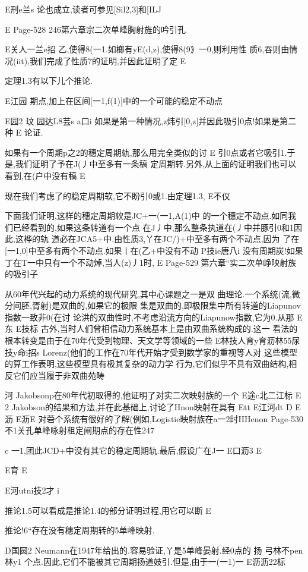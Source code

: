 {{E刑e兰s
论也成立,读者可参见[Sil2,3]和[ILJ

E
Page-528
246第六章宗二次单峰胸射旌的吟引孔

E关人一兰e招
乙,使得8(一1.如榔有yE(d,z),使得8(9》一0,则利用性
质6,吞则由情况(iit),我们完成了性质7的证明,并因此证明了定
E

定理1.3有以下儿个推论.

E江园
期点,加上在区间[一1,f(1)]中的一个可能的稳定不动点

E园2
玟
园达L8芸s
a口i
如果是第一种情况,z炜引[0,z]并因此吸引0点!如果是第二种
E
论证.

如果有一个周期p之2的穗定周期轨,那么用完全类似的讨
E
引0点或者它吸引1.于是,我们证明了予在J(丿中至多有一条稿
定周期转.另外,从上面的证明我们也可以看到,在(户中没有稿
E

现在我们考虑了的稳定周期软,它不盼引0或1.由定理1.3,
E不仪

下面我们证明,这样的穗定周期软是JC+一(一1,A(1)中
的一个穗定不动点.如同我们已经看到的,如果这条转道有一个点
在J丿中,那么整条执道在(丿中并豚引0和1因此,这桦的轨
道必在JCA5+中.由性质3,丫在JC/)+中至多有两个不动点,因为
了在[一1,0]中至多有两个不动点.如果丨在(乙+中没有不动
P技ie唐八i
没有周期炭!如果丁在T一中只有一个不动焯,当人(z)丿1时,
E
Page-529
第六章“实二次单峥映射族的吸引子

从60年代兴起的动力系统的现代研究,其中心课题之一是双
曲理论.一个系统(流,微分间胚,胥射)是双曲的,如果它的极限
集是双曲的,即极限集中所有转道的Liapunov指数一致非0(在讨
论洪的双曲性时,不考虑沿流方向的Liapunow指数,它为0.从那
E东
E技标
古外,当时人们曾相信动力系统基本上是由双曲系统构成的.这一
看法的根本转变是由于在70年代受到物理、天文学等领域的一些
E林技人育y育沥林55尿技y命i招s
Lorenz(他们的工作在70年代开始才受到数学家的重视等人对
这些模型的算工作表明,这些模型具有极其复杂的动力学
行为,它们似乎不具有双曲结构,相反它们应当履于非双曲苑畴

河
Jakobsonp在80年代初取得的,他证明了对实二次映射族的一个
E途c北二江标
E
2
Jakobson的结果和方法,并在此基础上,讨论了Hnon映射在具有
Ett
E江河dt
D
E沥
E沥E
对菪个系统有很好的了解(例如,Logistie映射族在a一2时HHenon
Page-530
不1关孔单峰咏射租定闸期点的存在性247

c
一1,团此JCD+中没有其它的稳定周期轨.最后,假设广在J一
E口沥3
E

E育
E

E河utni技2才
i

推论1.5可以看成是推论1.4的部分证明过程,用它可以断
E

推论!6“存在没有穗定周期转的5单峰映射.

D国圆2
Neumann在1947年给出的.容易验证,丫是5单峰晏射.经0点的
扬
弓林不pen林y1
个点.因此,它们不能被其它周期扬道妓引.但是,由于一(一1)一
E沥沥22标

}}
